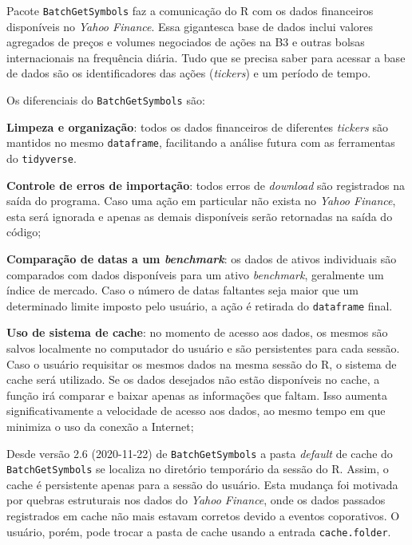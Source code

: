 \documentclass[
  11pt,
]{book}
\newenvironment{rmdimportant}
{\begin{importantblock}

	} {\end{importantblock}}
\begin{document}

Pacote \texttt{BatchGetSymbols} faz a comunicação do R com os dados financeiros disponíveis no \emph{Yahoo Finance}. Essa gigantesca base de dados inclui valores agregados de preços e volumes negociados de ações na B3 e outras bolsas internacionais na frequência diária. Tudo que se precisa saber para acessar a base de dados são os identificadores das ações (\emph{tickers}) e um período de tempo.

Os diferenciais do \texttt{BatchGetSymbols} são:

\textbf{Limpeza e organização}: todos os dados financeiros de diferentes \emph{tickers} são mantidos no mesmo \texttt{dataframe}, facilitando a análise futura com as ferramentas do \texttt{tidyverse}.

\textbf{Controle de erros de importação}: todos erros de \emph{download} são registrados na saída do programa. Caso uma ação em particular não exista no \emph{Yahoo Finance}, esta será ignorada e apenas as demais disponíveis serão retornadas na saída do código;

\textbf{Comparação de datas a um \emph{benchmark}}: os dados de ativos individuais são comparados com dados disponíveis para um ativo \emph{benchmark}, geralmente um índice de mercado. Caso o número de datas faltantes seja maior que um determinado limite imposto pelo usuário, a ação é retirada do \texttt{dataframe} final.

\textbf{Uso de sistema de cache}: no momento de acesso aos dados, os mesmos são salvos localmente no computador do usuário e são persistentes para cada sessão. Caso o usuário requisitar os mesmos dados na mesma sessão do R, o sistema de cache será utilizado. Se os dados desejados não estão disponíveis no cache, a função irá comparar e baixar apenas as informações que faltam. Isso aumenta significativamente a velocidade de acesso aos dados, ao mesmo tempo em que minimiza o uso da conexão a Internet;

\begin{rmdimportant}
Desde versão 2.6 (2020-11-22) de \texttt{BatchGetSymbols} a pasta
\emph{default} de cache do \texttt{BatchGetSymbols} se localiza no
diretório temporário da sessão do R. Assim, o cache é persistente apenas
para a sessão do usuário. Esta mudança foi motivada por quebras
estruturais nos dados do \emph{Yahoo Finance}, onde os dados passados
registrados em cache não mais estavam corretos devido a eventos
coporativos. O usuário, porém, pode trocar a pasta de cache usando a
entrada \texttt{cache.folder}.
\end{rmdimportant}
\end{document}
